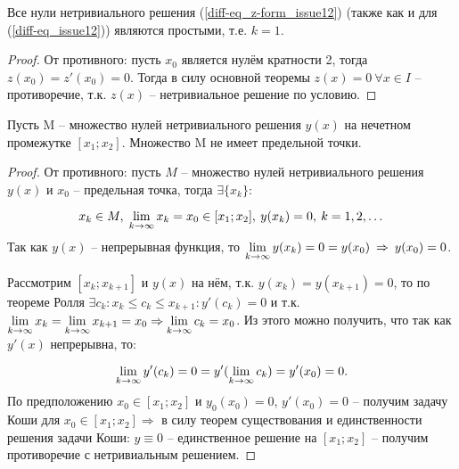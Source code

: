 \begin{lemma}\label{sol-zeros_issue12}
Все нули нетривиального решения (\ref{diff-eq_z-form_issue12}) (также как и для (\ref{diff-eq_issue12})) являются простыми, т.е. $k = 1$.
\end{lemma}

\begin{proof}
От противного: пусть $x_0$ является нулём кратности 2, тогда $z(x_0) = z'(x_0) = 0$. Тогда в силу основной теоремы $z(x) = 0 \: \forall x \in I$ -- противоречие, т.к. $z(x)$ -- нетривиальное решение по условию.
\end{proof}

\begin{lemma}\label{sol-set_issue12}
Пусть M -- множество нулей нетривиального решения $y(x)$ на нечетном промежутке $[x_1;x_2]$. Множество M не имеет предельной точки.
\end{lemma}

\begin{proof}
От противного: пусть $M$ -- множество нулей нетривиального решения $y(x)$ и $x_0$ -- предельная точка, тогда $\exists \{x_k\} :$

\[x_k \in M, \; \lim\limits_{k\rightarrow \infty} x_k = x_0 \in [x_1;x_2], \: y(x_k) = 0, \: k = 1, 2, \dots\]
Так как $y(x)$ -- непрерывная функция, то $\lim\limits_{k\rightarrow \infty} y(x_k) = 0 = y(x_0) \: \Rightarrow \: y(x_0) = 0$.

Рассмотрим $[x_k;x_{k+1}]$ и $y(x)$ на нём, т.к. $y(x_k) = y(x_{k+1}) = 0$, то по теореме Ролля $\exists c_k: x_k \leqslant c_k \leqslant x_{k+1}: y'(c_k) = 0$ и т.к. $\lim\limits_{k\rightarrow \infty} x_k = \lim\limits_{k\rightarrow \infty} x_{k+1} = x_0 \Rightarrow \lim\limits_{k\rightarrow \infty} c_k = x_0$. Из этого можно получить, что так как $y'(x)$ непрерывна, то:

\[\lim\limits_{k\rightarrow \infty} y' (c_k) = 0 = y' (\lim\limits_{k\rightarrow \infty} c_k) = y'(x_0) = 0.\]
По предположению $x_0 \in [x_1;x_2]$ и $y_0(x_0) = 0$, $y'(x_0) = 0$ -- получим задачу Коши для $x_0 \in [x_1;x_2] \Rightarrow$ в силу теорем существования и единственности решения задачи Коши: $y\equiv 0$ -- единственное решение на $[x_1;x_2]$ -- получим противоречие с нетривиальным решением.
\end{proof}

